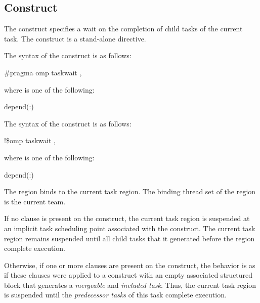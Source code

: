 {{{{\subsection{ Construct}
\label{subsec:taskwait Construct}
\summary
The  construct specifies a wait on the completion of child tasks
of the current task. The  construct is a stand-alone directive.

\syntax
\ccppspecificstart
The syntax of the  construct is as follows:

\begin{boxedcode}
\#pragma omp taskwait \plc{[clause[ [},\plc{] clause] ... ] new-line}
\end{boxedcode}
\ccppspecificend

where  is one of the following:

\begin{indentedcodelist}
depend(:)
\end{indentedcodelist}
\ccppspecificend

\fortranspecificstart
The syntax of the  construct is as follows:

\begin{boxedcode}
!\$omp taskwait \plc{[clause[ [},\plc{] clause] ... ]}
\end{boxedcode}

where  is one of the following:

\begin{indentedcodelist}
depend(:)
\end{indentedcodelist}

\fortranspecificend

\binding
The  region binds to the current task region. The binding thread set of the 
 region is the current team.

\descr

If no  clause is present on the  construct, the
current task region is suspended at an implicit task scheduling point
associated with the construct. The current task region remains suspended until
all child tasks that it generated before the  region complete
execution.

Otherwise, if one or more  clauses are present on the
 construct, the behavior is as if these clauses were applied to
a  construct with an empty associated structured block that
generates a \emph{mergeable} and \emph{included task}. Thus, the current task region is
suspended until the \emph{predecessor tasks} of this task complete execution.

}}}}
